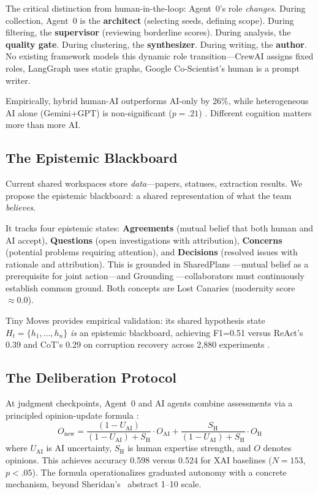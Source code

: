 \documentclass{article}
\begin{document}
The critical distinction from human-in-the-loop: Agent~0's role
\emph{changes}. During collection, Agent~0 is the \textbf{architect}
(selecting seeds, defining scope). During filtering, the
\textbf{supervisor} (reviewing borderline scores). During analysis, the
\textbf{quality gate}. During clustering, the \textbf{synthesizer}.
During writing, the \textbf{author}. No existing framework models this
dynamic role transition---CrewAI assigns fixed roles, LangGraph uses
static graphs, Google Co-Scientist's human is a prompt writer.

Empirically, hybrid human-AI outperforms AI-only by 26\%, while
heterogeneous AI alone (Gemini+GPT) is non-significant ($p\!=\!.21$)
\cite{li2026humanai}. Different cognition matters more than more AI.


\subsection{The Epistemic Blackboard}
\label{sec:epistemic}

Current shared workspaces store \emph{data}---papers, statuses,
extraction results. We propose the epistemic blackboard: a shared
representation of what the team \emph{believes}.

It tracks four epistemic states: \textbf{Agreements} (mutual belief that
both human and AI accept), \textbf{Questions} (open investigations with
attribution), \textbf{Concerns} (potential problems requiring
attention), and \textbf{Decisions} (resolved issues with rationale and
attribution). This is grounded in SharedPlans
\cite{grosz1996collaborative}---mutual belief as a prerequisite for joint
action---and Grounding \cite{clark1991grounding}---collaborators must
continuously establish common ground. Both concepts are Lost Canaries
(modernity score $\approx 0.0$).

Tiny Moves provides empirical validation: its shared hypothesis state
$H_t = \{h_1, \ldots, h_n\}$ \emph{is} an epistemic blackboard,
achieving F1=0.51 versus ReAct's 0.39 and CoT's 0.29 on corruption
recovery across 2,880 experiments \cite{dobrowolska2026tinymoves}.


\subsection{The Deliberation Protocol}
\label{sec:deliberation}

At judgment checkpoints, Agent~0 and AI agents combine assessments via a
principled opinion-update formula
\cite{ma2025deliberation}:
\begin{equation}
O_{\text{new}} = \frac{(1 - U_{\text{AI}})}{(1 - U_{\text{AI}}) + S_{\text{H}}} \cdot O_{\text{AI}} + \frac{S_{\text{H}}}{(1 - U_{\text{AI}}) + S_{\text{H}}} \cdot O_{\text{H}}
\label{eq:deliberation}
\end{equation}
where $U_{\text{AI}}$ is AI uncertainty, $S_{\text{H}}$ is human
expertise strength, and $O$ denotes opinions. This achieves accuracy
0.598 versus 0.524 for XAI baselines ($N\!=\!153$, $p\!<\!.05$). The
formula operationalizes graduated autonomy with a concrete mechanism,
beyond Sheridan's~ abstract 1--10
scale.
\end{document}
